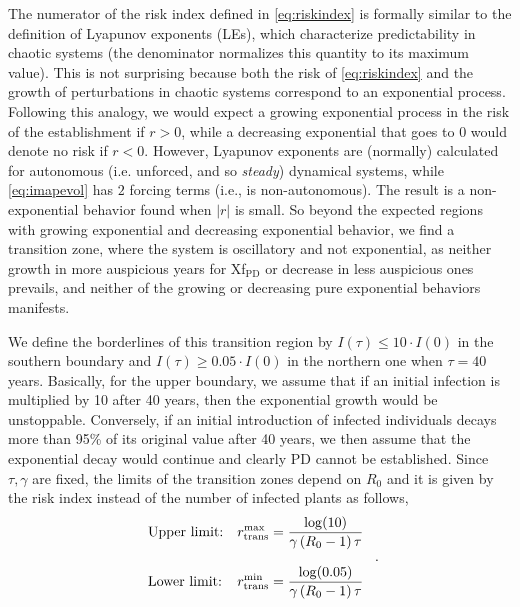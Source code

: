 The numerator of the risk index defined in \cref{eq:riskindex} is formally
similar to the definition of Lyapunov exponents (LEs), which characterize
predictability in chaotic systems (the denominator normalizes this quantity to
its maximum value). This is not surprising because both the risk of
\cref{eq:riskindex} and the growth of perturbations in chaotic systems
correspond to an exponential process.
Following this analogy, we would expect a growing exponential process in
the risk of the establishment if $r>0$, while a decreasing exponential that
goes to $0$ would denote no risk if $r<0$.
However, Lyapunov exponents are (normally) calculated for autonomous (i.e.
unforced, and so \textit{steady}) dynamical systems, while \cref{eq:imapevol}
has $2$ forcing terms (i.e., is non-autonomous).
The result is a non-exponential behavior found when $|r|$ is small. So
beyond the expected regions with growing exponential and decreasing exponential
behavior, we find a transition zone, where the system is oscillatory and not
exponential, as neither growth in more auspicious years for Xf$_{\textrm{PD}}$
or decrease in less auspicious ones prevails, and neither of the growing or
decreasing pure exponential behaviors manifests.

We define the borderlines of this transition region by $I(\tau)\leq10 \cdot
    I(0)$ in the southern boundary and $I(\tau)\geq 0.05 \cdot I(0)$ in the
northern one when $\tau=40$ years. Basically, for the upper boundary, we assume
that if an initial infection is multiplied by 10 after 40 years, then the
exponential growth would be unstoppable. Conversely, if an initial introduction
of infected individuals decays more than 95\% of its original value after 40
years, we then assume that the exponential decay would continue and clearly PD
cannot be established. Since $\tau, \gamma$ are fixed, the limits of the
transition zones depend on $R_0 $ and it is given by the risk index instead of
the number of infected plants as follows,
\begin{equation}
    \begin{array}{ll}
        \displaystyle \textrm{Upper limit:} & \displaystyle

        r_{\textrm{trans}}^{\textrm{max}}=\frac{\log(10)}{\gamma\left(R_0-1\right)\tau}
        \\\\
        \displaystyle \textrm{Lower limit:} & \displaystyle

        r_{\textrm{trans}}^{\textrm{min}}=\frac{\log(0.05)}{\gamma\left(R_0-1\right)\tau}
    \end{array} \ .
\end{equation}


